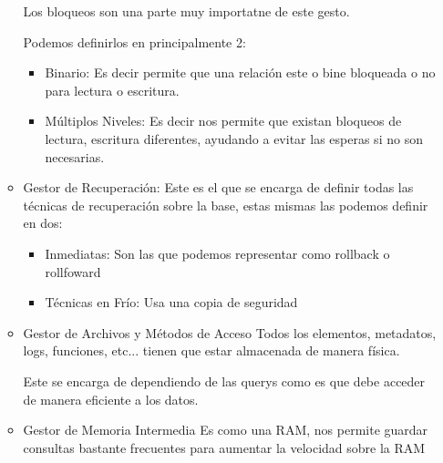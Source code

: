 \documentclass[12pt, fleqn]{report}                             %
\begin{document}
\begin{itemize}
\begin{itemize}
                                Los bloqueos son una parte muy importatne de este gesto.

                                Podemos definirlos en principalmente 2:
                                \begin{itemize}
                                    \item Binario:
                                        Es decir permite que una relación este o bine bloqueada
                                        o no para lectura o escritura.
                                    \item Múltiplos Niveles:
                                        Es decir nos permite que existan bloqueos de lectura,
                                        escritura diferentes, ayudando a evitar las esperas si no
                                        son necesarias.
                                \end{itemize}

                            \item Gestor de Recuperación:
                                Este es el que se encarga de definir todas las técnicas de recuperación
                                sobre la base, estas mismas las podemos definir en dos:
                                \begin{itemize}
                                    \item Inmediatas: Son las que podemos representar como rollback o rollfoward
                                    \item Técnicas en Frío: Usa una copia de seguridad
                                \end{itemize}


                            \item Gestor de Archivos y Métodos de Acceso
                                Todos los elementos, metadatos, logs, funciones, etc... tienen que estar
                                almacenada de manera física.

                                Este se encarga de dependiendo de las querys como es que debe acceder de 
                                manera eficiente a los datos.

                            \item Gestor de Memoria Intermedia
                                Es como una RAM, nos permite guardar consultas bastante frecuentes
                                para aumentar la velocidad sobre la RAM
                        \end{itemize}

            \end{itemize}
\end{document}
